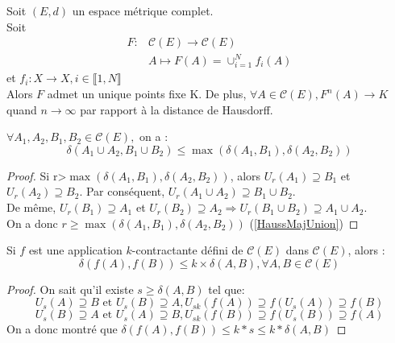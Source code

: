 \documentclass[a4paper, 12pt]{report}
\begin{document}
			\begin{theorem}
			\label{ThmConverge}
				Soit $(E,d)$ un espace métrique complet.\\
				Soit 
				\begin{align*}
					F:&\mathcal{C}(E)\longrightarrow \mathcal{C}(E)\\
					&A\longmapsto F(A)=\cup^N_{i=1}f_i(A)
				\end{align*}
				et $f_i:X \longrightarrow X, i\in\llbracket 1,N\rrbracket$\\
				Alors $F$ admet un unique points fixe K. De plus, $\forall A\in\mathcal{C}(E), F^n(A)\longrightarrow K$ quand ${n\to\infty}$ par rapport à la distance de Hausdorff.
			\end{theorem}

			\begin{lemma}
				\label{lemme118}
				$\forall A_1,A_2,B_1,B_2\in\mathcal{C}(E),$ on a :
				\begin{equation}
					\label{HaussMajUnion}
					\delta(A_1\cup A_2 , B_1\cup B_2)\leq \max(\delta(A_1,B_1), \delta(A_2,B_2))
				\end{equation}
			\end{lemma}
		
			\begin{proof}
				Si r>$\max(\delta(A_1,B_1), \delta(A_2,B_2))$, alors $U_r(A_1)\supseteq B_1$ et $U_r(A_2)\supseteq B_2$. Par conséquent, $U_r(A_1\cup A_2)\supseteq B_1\cup B_2$.\\
				De même, $U_r(B_1)\supseteq A_1$ et $U_r(B_2)\supseteq A_2\Longrightarrow U_r(B_1\cup B_2)\supseteq A_1\cup A_2$.\\
				On a donc $r\geq \max(\delta(A_1,B_1), \delta(A_2,B_2)) $ (\ref{HaussMajUnion})
			\end{proof}

			\begin{lemma}
			\label{lemme119}
				Si $f$ est une application $k$-contractante défini de $\mathcal{C}(E)$ dans $\mathcal{C}(E)$, alors :
				\begin{equation}
					\delta(f(A),f(B))\leq k\times \delta(A,B),\forall A,B\in\mathcal{C}(E)
				\end{equation}
			\end{lemma}
			
			\begin{proof}
				On sait qu'il existe $s\geq\delta(A,B)$ tel que:
				\begin{equation*}
					U_s(A)\supseteq B \textrm{ et } U_s(B)\supseteq A,  U_{sk}(f(A))\supseteq f(U_s(A))\supseteq f(B)					
				\end{equation*}
				\begin{equation*}
					U_s(B)\supseteq A \textrm{ et } U_s(A)\supseteq B,  U_{sk}(f(B))\supseteq f(U_s(B))\supseteq f(A)
				\end{equation*}
				On a donc montré que $\delta(f(A),f(B))\leq k*s\leq k*\delta(A,B)$

			\end{proof}
\end{document}
